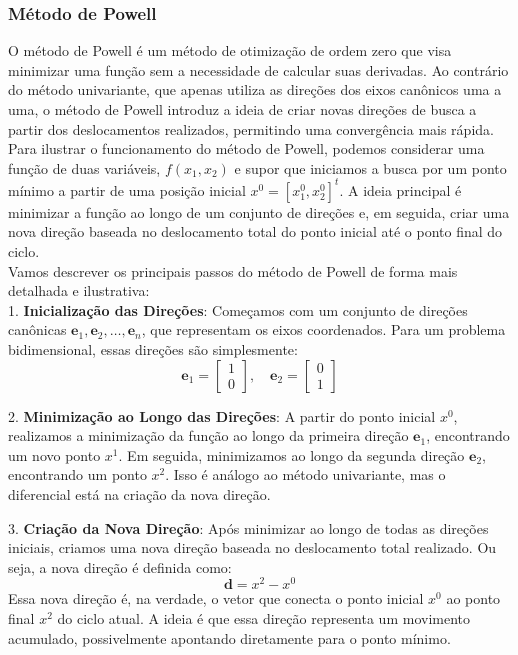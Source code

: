 \documentclass[a4paper, 12pt]{article}
\begin{document}
\subsubsection{Método de Powell}

O método de Powell é um método de otimização de ordem zero que visa minimizar uma função sem a necessidade de calcular suas derivadas. Ao contrário do método univariante, que apenas utiliza as direções dos eixos canônicos uma a uma, o método de Powell introduz a ideia de criar novas direções de busca a partir dos deslocamentos realizados, permitindo uma convergência mais rápida.\\

Para ilustrar o funcionamento do método de Powell, podemos considerar uma função de duas variáveis, \(f(x_1, x_2)\) e supor que iniciamos a busca por um ponto mínimo a partir de uma posição inicial \(x^0 = [x_1^0, x_2^0]^t\). A ideia principal é minimizar a função ao longo de um conjunto de direções e, em seguida, criar uma nova direção baseada no deslocamento total do ponto inicial até o ponto final do ciclo.\\

Vamos descrever os principais passos do método de Powell de forma mais detalhada e ilustrativa:\\

1. \textbf{Inicialização das Direções}: Começamos com um conjunto de direções canônicas \(\mathbf{e}_1, \mathbf{e}_2, \dots, \mathbf{e}_n\), que representam os eixos coordenados. Para um problema bidimensional, essas direções são simplesmente:
    \[
    \mathbf{e}_1 = \begin{bmatrix} 1 \\ 0 \end{bmatrix}, \quad \mathbf{e}_2 = \begin{bmatrix} 0 \\ 1 \end{bmatrix}
    \]

2. \textbf{Minimização ao Longo das Direções}: A partir do ponto inicial \(x^0\), realizamos a minimização da função ao longo da primeira direção \(\mathbf{e}_1\), encontrando um novo ponto \(x^1\). Em seguida, minimizamos ao longo da segunda direção \(\mathbf{e}_2\), encontrando um ponto \(x^2\). Isso é análogo ao método univariante, mas o diferencial está na criação da nova direção.

3. \textbf{Criação da Nova Direção}: Após minimizar ao longo de todas as direções iniciais, criamos uma nova direção baseada no deslocamento total realizado. Ou seja, a nova direção é definida como:
    \[
    \mathbf{d} = x^2 - x^0
    \]
    Essa nova direção é, na verdade, o vetor que conecta o ponto inicial \(x^0\) ao ponto final \(x^2\) do ciclo atual. A ideia é que essa direção representa um movimento acumulado, possivelmente apontando diretamente para o ponto mínimo.
\end{document}
